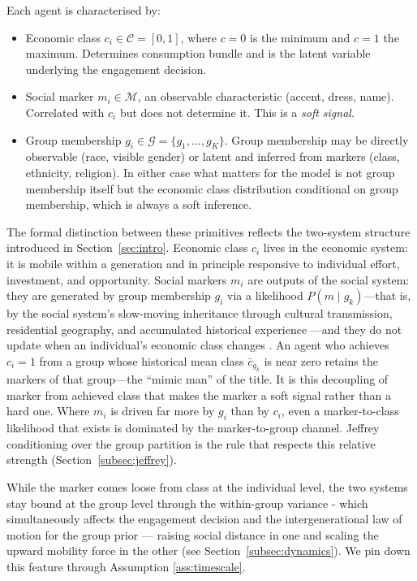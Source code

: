 \documentclass[pdflatex,sn-basic]{sn-jnl}
\newcommand{\G}{\mathcal{G}}
\newcommand{\M}{\mathcal{M}}
\newcommand{\C}{\mathcal{C}}
\theoremstyle{thmstyleone}
\numberwithin{proposition}{subsection}
\begin{document}
Each agent is characterised by:
\begin{itemize}[noitemsep]
  \item Economic class $c_i \in \C = [0,1]$, where $c = 0$ is the
  minimum and $c = 1$ the maximum. Determines consumption bundle and
  is the latent variable underlying the engagement decision.
  
  \item Social marker $m_i \in \M$, an observable characteristic
  (accent, dress, name). Correlated with $c_i$
  but does not determine it. This is a \emph{soft signal}.
  
  \item Group membership $g_i \in \G = \{g_1, \ldots, g_K\}$.
  Group membership may be directly observable (race, visible gender)
  or latent and inferred from markers (class, ethnicity, religion).
  In either case what matters for the model is not group membership
  itself but the economic class distribution conditional on group
  membership, which is always a soft inference.
\end{itemize}

The formal distinction between these primitives reflects the
two-system structure introduced in Section~\ref{sec:intro}. Economic
class $c_i$ lives in the economic system: it is mobile within a
generation and in principle responsive to individual effort, investment,
and opportunity. Social markers $m_i$ are outputs of the social
system: they are generated by group membership $g_i$ via a likelihood
$P(m \mid g_k)$---that is, by the social system's slow-moving
inheritance through cultural transmission, residential geography,
and accumulated historical experience
\citep{BisinVerdier2001}---and they
do not update when an individual's economic class changes
\citep[individual-level durability:][]{Bourdieu1984}. An agent who achieves $c_i = 1$ from a group whose historical mean class
$\bar{c}_{g_k}$ is near zero retains the markers of that group---the
``mimic man'' of the title. It is this decoupling of marker from achieved class that makes the
marker a soft signal rather than a hard one. Where $m_i$ is driven
far more by $g_i$ than by $c_i$, even a marker-to-class likelihood
that exists is dominated by the marker-to-group channel. Jeffrey
conditioning over the group partition is the rule that respects this
relative strength (Section~\ref{subsec:jeffrey}). 

While the marker comes loose from class at the individual level, the two systems stay bound at the group level through the within-group variance - which simultaneously affects the engagement decision and the intergenerational law of motion for the group prior --- raising social distance in
one and scaling the upward mobility force in the
other (see Section~\ref{subsec:dynamics}). We pin down this feature through Assumption \ref{ass:timescale}.
\end{document}
